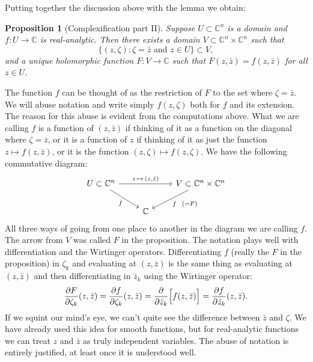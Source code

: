 \documentclass[12pt,openany]{book}
\newcommand{\C}{{\mathbb{C}}}
\theoremstyle{plain}
\newtheorem{prop}[thm]{Proposition}
\theoremstyle{remark}
\theoremstyle{definition}
\theoremstyle{exercise}
\theoremstyle{example}
\begin{document}
Putting together the discussion above with the lemma we obtain:

\begin{prop}[Complexification part II] \label{prop:complexificationpt2}
Suppose $U \subset \C^n$ is a domain and $f \colon U \to \C$ is
real-analytic.
Then there exists a domain $V \subset \C^n \times \C^n$ such that
\begin{equation*}
\bigl\{ (z,\zeta) : \zeta = \bar{z} \text{ and } z \in U \bigr\} \subset V ,
\end{equation*}
and a unique holomorphic function $F \colon V \to \C$ such that
$F(z,\bar{z}) = f(z,\bar{z})$ for all $z \in U$.
\end{prop}

The function $f$ can be thought of as the restriction of $F$ to the set
where $\zeta = \bar{z}$.  We will abuse notation and write
simply $f(z,\zeta)$ both for $f$ and its extension.
The reason for this abuse is evident from the computations above.
What we are calling $f$ is a function of $(z,\bar{z})$ if thinking
of it as a function on the diagonal where $\zeta=\bar{z}$, or it is a function of
$z$ if thinking of it as just the function $z \mapsto f(z,\bar{z})$, or
it is the function $(z,\zeta) \mapsto f(z,\zeta)$.  We have the
following commutative diagram:
\begin{equation*}
\begin{tikzcd}
U \subset \C^n \ar[rr, "{z \, \mapsto \, (z,\bar{z})}"] \ar[dr, "f"']
&
&
V \subset \C^n \times \C^n \ar[dl, "f ~~ {(=F)}"]
\\
&
\C
\end{tikzcd}
\end{equation*}
All three ways of going from one place to another in the diagram
we are calling $f$.  The arrow from $V$ was called $F$ in the proposition.
The notation plays well with differentiation and the Wirtinger operators.
Differentiating $f$ (really the $F$ in the proposition) in $\zeta_k$ and
evaluating at $(z,\bar{z})$ is the same thing as evaluating at
$(z,\bar{z})$ and then differentiating in $\bar{z}_k$ using the Wirtinger
operator:
\begin{equation*}
\frac{\partial F}{\partial \zeta_k}(z,\bar{z}) =
\frac{\partial f}{\partial \zeta_k}(z,\bar{z}) =
\frac{\partial}{\partial \bar{z}_k}\Bigl[ f(z,\bar{z}) \Bigr] =
\frac{\partial f}{\partial \bar{z}_k}(z,\bar{z}) .
\end{equation*}
If we squint our mind's eye,
we can't quite see the difference between $\bar{z}$ and $\zeta$.
We have already used this idea for smooth functions, but for
real-analytic functions we can
treat $z$ and $\bar{z}$ as truly independent variables.
The abuse of notation is entirely justified, at least once it is
understood well.
\end{document}
